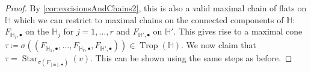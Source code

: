 \documentclass[10pt,a4paper]{amsart}
\DeclareMathOperator{\Star}{Star}
\DeclareMathOperator{\Trop}{Trop}
\newcommand{\HH}{\mathbb{H}}
\begin{document}
\begin{proof}
  By \cref{cor:excisionsAndChains2}, this is also a valid maximal chain of flats on $\HH$ which we can restrict to maximal chains on the connected components of $\HH$: $F_{\HH_j,\bullet}$ on the $\HH_j$ for $j=1,\dots,r$ and $F_{\HH',\bullet}$ on $\HH'$.  This gives rise to a maximal cone $\tau\coloneqq \sigma((F_{\HH_1,\bullet},\dots,F_{\HH_r,\bullet},F_{\HH',\bullet}))\in\Trop(\HH)$.  We now claim that $\tau=\Star_{\sigma(F_{[m],\bullet})}(v)$.  This can be shown using the same steps as before.
\end{proof}
\end{document}
